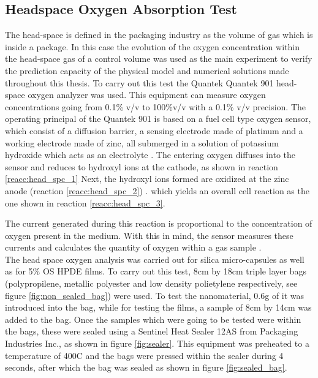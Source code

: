 \begin{refsection}
\subsection{Headspace Oxygen Absorption Test}\label{sec:headspace}
The head-space is defined in the packaging industry as the volume of gas which is inside a package. In this case the evolution of the oxygen concentration within the head-space gas of a control volume was used as the main experiment to verify the prediction capacity of the physical model and numerical solutions made throughout this thesis. To carry out this test the Quantek Quantek 901 head-space oxygen analyzer was used. This equipment can measure oxygen concentrations going from 0.1\% v/v to 100\%v/v with a 0.1\% v/v precision. The operating principal of the Quantek 901 is based on a fuel cell type oxygen sensor, which consist of a diffusion barrier, a sensing electrode made of platinum and a working electrode made of zinc, all submerged in a solution of potassium hydroxide which acts as an electrolyte \cite{Boissevain1996CorporateGuide}. The entering oxygen diffuses into the sensor and reduces to hydroxyl ions at the cathode, as shown in reaction \ref{reacc:head_spc_1}  Next, the hydroxyl ions formed are oxidized at the zinc anode (reaction \ref{reacc:head_spc_2}) .
 which yields an overall cell reaction as the one shown in reaction \ref{reacc:head_spc_3}.

 
 The current generated during this reaction is proportional to the concentration of oxygen present in the medium. With this in mind,  the sensor measures these currents and calculates the quantity of oxygen within a gas sample \cite{GarciaMora2015KineticScavengers, Boissevain1996CorporateGuide}.\\
 
 The head space oxygen analysis was carried out for silica micro-capsules as well as for 5\% OS HPDE films. To carry out this test, 8cm by 18cm triple layer bags (polypropilene, metallic polyester and low density polietylene respectively, see figure \ref{fig:non_sealed_bag}) were used. To test the nanomaterial, 0.6g of it was introduced into the bag, while for testing the films, a sample of 8cm by 14cm was added to the bag. Once the samples which were going to be tested were within the bags, these were sealed using a Sentinel Heat Sealer 12AS from Packaging Industries Inc., as shown in figure \ref{fig:sealer}. This equipment was preheated to a temperature of 400\degree C and the bags  were pressed within the sealer during 4 seconds, after which the bag was sealed as shown in figure \ref{fig:sealed_bag}.  
 

\end{refsection}
